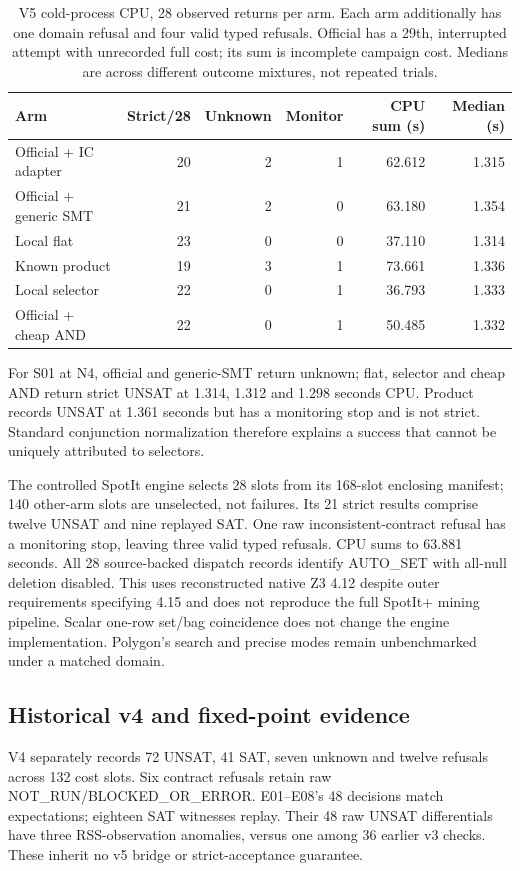 \begin{table}[htbp]
\centering
\begin{tabular}{lrrrrr}
\toprule
Arm & Strict/28 & Unknown & Monitor & CPU sum (s) & Median (s)\\
\midrule
Official + IC adapter & 20 & 2 & 1 & 62.612 & 1.315\\
Official + generic SMT & 21 & 2 & 0 & 63.180 & 1.354\\
Local flat & 23 & 0 & 0 & 37.110 & 1.314\\
Known product & 19 & 3 & 1 & 73.661 & 1.336\\
Local selector & 22 & 0 & 1 & 36.793 & 1.333\\
Official + cheap AND & 22 & 0 & 1 & 50.485 & 1.332\\
\bottomrule
\end{tabular}
\caption{V5 cold-process CPU, 28 observed returns per arm. Each arm additionally has one domain refusal and four valid typed refusals. Official has a 29th, interrupted attempt with unrecorded full cost; its sum is incomplete campaign cost. Medians are across different outcome mixtures, not repeated trials.}\label{tab:v5cost}
\end{table}

For S01 at N4, official and generic-SMT return unknown; flat, selector and cheap AND return strict UNSAT at 1.314, 1.312 and 1.298 seconds CPU. Product records UNSAT at 1.361 seconds but has a monitoring stop and is not strict. Standard conjunction normalization therefore explains a success that cannot be uniquely attributed to selectors.

The controlled SpotIt engine selects 28 slots from its 168-slot enclosing manifest; 140 other-arm slots are unselected, not failures. Its 21 strict results comprise twelve UNSAT and nine replayed SAT. One raw inconsistent-contract refusal has a monitoring stop, leaving three valid typed refusals. CPU sums to 63.881 seconds. All 28 source-backed dispatch records identify AUTO\_SET with all-null deletion disabled. This uses reconstructed native Z3 4.12 despite outer requirements specifying 4.15 and does not reproduce the full SpotIt+ mining pipeline. Scalar one-row set/bag coincidence does not change the engine implementation. Polygon's search and precise modes remain unbenchmarked under a matched domain.

\subsection{Historical v4 and fixed-point evidence}
V4 separately records 72 UNSAT, 41 SAT, seven unknown and twelve refusals across 132 cost slots. Six contract refusals retain raw NOT\_RUN/BLOCKED\_OR\_ERROR. E01--E08's 48 decisions match expectations; eighteen SAT witnesses replay. Their 48 raw UNSAT differentials have three RSS-observation anomalies, versus one among 36 earlier v3 checks. These inherit no v5 bridge or strict-acceptance guarantee.

